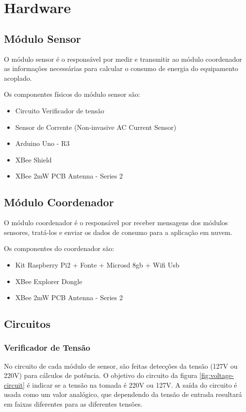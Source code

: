 \section{Hardware}
\label{Sec:hardware}
\subsection{Módulo Sensor}

O módulo sensor é o responsável por medir e transmitir ao módulo coordenador as informações necessárias para calcular o consumo de energia do equipamento acoplado.

Os componentes físicos do módulo sensor são:

\begin{itemize}
\item Circuito Verificador de tensão
\item Sensor de Corrente (Non-invasive AC Current Sensor)
\item Arduino Uno - R3
\item XBee Shield
\item XBee 2mW PCB Antenna - Series 2
\end{itemize}
%
\subsection{Módulo Coordenador}

O módulo coordenador é o responsável por receber mensagens dos módulos sensores, tratá-los e enviar os dados de consumo para a aplicação em nuvem.

Os componentes do coordenador são:

\begin{itemize}
\item Kit Raspberry Pi2 + Fonte + Microsd 8gb + Wifi Usb
\item XBee Explorer Dongle
\item XBee 2mW PCB Antenna - Series 2
\end{itemize}
%
\subsection{Circuitos}
\subsubsection{Verificador de Tensão}

No circuito de cada módulo de sensor, são feitas detecções da tensão (127V ou 220V) para cálculos de potência.  O objetivo do circuito da figura \ref{fig:voltage-circuit} é indicar se a tensão na tomada é 220V ou 127V. A saída do circuito é usada como um valor analógico, que dependendo da tensão de entrada resultará em faixas diferentes para as diferentes tensões.


